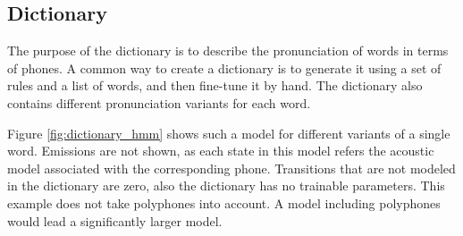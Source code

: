 \subsection{Dictionary}
\label{sec:dictionary}
The purpose of the dictionary is to describe the pronunciation of words in terms of phones. A common way to create a dictionary is to generate it using a set of rules and a list of words, and then fine-tune it by hand. The dictionary also contains different pronunciation variants for each word. 
\\
\begin{minipage}{\linewidth}
	\label{fig:dictionary_hmm}
	\hspace{1cm}
\end{minipage}
Figure \ref{fig:dictionary_hmm} shows such a model for different variants of a single word. Emissions are not shown, as each state in this model refers the acoustic model associated with the corresponding phone. Transitions that are not modeled in the dictionary are zero, also the dictionary has no trainable parameters. This example does not take polyphones into account. A model including polyphones would lead a significantly larger model. 
 
